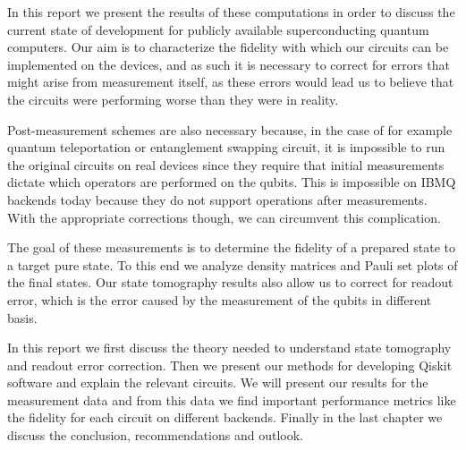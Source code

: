 In this report we present the results of these computations in order to discuss
the current state of development for publicly available superconducting quantum
computers. Our aim is to characterize the fidelity with which our circuits can
be implemented on the devices, and as such it is necessary to correct for errors
that might arise from measurement itself, as these errors would lead us to
believe that the circuits were performing worse than they were in reality.

Post-measurement schemes are also necessary because, in the case of for example
quantum teleportation or entanglement swapping circuit, it is impossible to run
the original circuits on real devices since they require that initial
measurements dictate which operators are performed on the qubits. This is impossible
on IBMQ backends today because they do not support operations after measurements. With
the appropriate corrections though, we can circumvent this complication.

The goal of these measurements is to determine the fidelity of a prepared state
to a target pure state. To this end we analyze density matrices and Pauli set
plots of the final states. Our state tomography results also allow us to correct
for readout error, which is the error caused by the measurement of the qubits in
different basis.

In this report we first discuss the theory needed to understand state tomography
and readout error correction. Then we present our methods for developing Qiskit
software and explain the relevant circuits. We will present our results for the
measurement data and from this data we find important performance metrics like
the fidelity for each circuit on different backends. Finally in the last chapter
we discuss the conclusion, recommendations and outlook.

